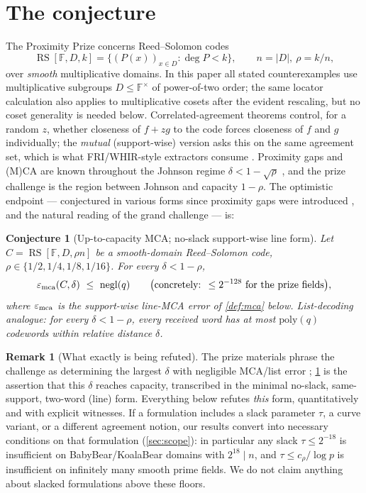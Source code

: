\documentclass[11pt]{article}
\newtheorem{conjecture}[conjecture]{Conjecture}
\theoremstyle{definition}
\newtheorem{remark}[remark]{Remark}
\newcommand{\F}{\mathbb F}
\newcommand{\RS}{\operatorname{RS}}
\newcommand{\eps}{\varepsilon}
\begin{document}
\section{The conjecture}

The Proximity Prize \cite{ProximityPrize,ABF26,BonehKeynote} concerns Reed--Solomon codes
\[
        \RS[\F,D,k]=\{(P(x))_{x\in D}:\deg P<k\},\qquad n=|D|,\ \rho=k/n,
\]
over \emph{smooth} multiplicative domains.  In this paper all stated counterexamples use multiplicative subgroups $D\le\F^\times$ of power-of-two order; the same locator calculation also applies to multiplicative cosets after the evident rescaling, but no coset generality is needed below.  Correlated-agreement theorems control, for a random $z$, whether closeness of $f+zg$ to the code forces closeness of $f$ and $g$ individually; the \emph{mutual} (support-wise) version asks this on the same agreement set, which is what FRI/WHIR-style extractors consume \cite{FRI,WHIR}.  Proximity gaps and (M)CA are known throughout the Johnson regime $\delta<1-\sqrt\rho$ \cite{BCIKS23}, and the prize challenge is the region between Johnson and capacity $1-\rho$.  The optimistic endpoint --- conjectured in various forms since proximity gaps were introduced \cite{BCIKS23}, and the natural reading of the grand challenge --- is:

\begin{conjecture}[Up-to-capacity MCA; no-slack support-wise line form]\label{conj:capacity}
Let $C=\RS[\F,D,\rho n]$ be a smooth-domain Reed--Solomon code, $\rho\in\{1/2,1/4,1/8,1/16\}$.  For every $\delta<1-\rho$,
\[
        \eps_{\rm mca}(C,\delta)\ \le\ \mathrm{negl}(q)
        \qquad\big(\text{concretely: }\le2^{-128}\text{ for the prize fields}\big),
\]
where $\eps_{\rm mca}$ is the support-wise line-MCA error of \cref{def:mca} below.  List-decoding analogue: for every $\delta<1-\rho$, every received word has at most $\mathrm{poly}(q)$ codewords within relative distance $\delta$.
\end{conjecture}

\begin{remark}[What exactly is being refuted]\label{rem:formulation}
The prize materials phrase the challenge as determining the largest $\delta$ with negligible MCA/list error \cite{ProximityPrize,ABF26}; \cref{conj:capacity} is the assertion that this $\delta$ reaches capacity, transcribed in the minimal no-slack, same-support, two-word (line) form.  Everything below refutes \emph{this} form, quantitatively and with explicit witnesses.  If a formulation includes a slack parameter $\tau$, a curve variant, or a different agreement notion, our results convert into necessary conditions on that formulation (\cref{sec:scope}): in particular any slack $\tau\le2^{-18}$ is insufficient on BabyBear/KoalaBear domains with $2^{18}\mid n$, and $\tau\le c_\rho/\log p$ is insufficient on infinitely many smooth prime fields.  We do not claim anything about slacked formulations above these floors.
\end{remark}
\end{document}
